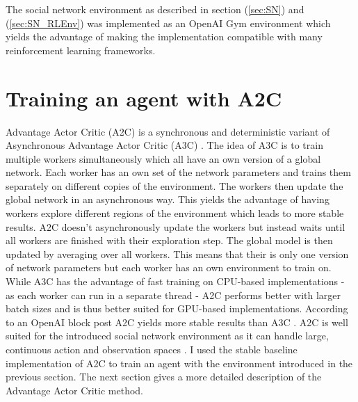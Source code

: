 \documentclass[11pt, a4paper]{article}
\begin{document}
The social network environment as described in section (\ref{sec:SN}) and (\ref{sec:SN_RLEnv}) was implemented as an OpenAI Gym \cite{gym} environment which yields the advantage of making the implementation compatible with many reinforcement learning frameworks.

\section{Training an agent with A2C}
Advantage Actor Critic (A2C) \cite{A2C_1} is a synchronous and deterministic variant of Asynchronous Advantage Actor Critic (A3C) \cite{A3C_1,A3C_2}. The idea of A3C is to train multiple workers simultaneously which all have an own version of a global network. Each worker has an own set of the network parameters and trains them separately on different copies of the environment. The workers then update the global network in an asynchronous way. This yields the advantage of having workers explore different regions of the environment which leads to more stable results. A2C doesn't asynchronously update the workers but instead waits until all workers are finished with their exploration step. The global model is then updated by averaging over all workers. This means that their is only one version of network parameters but each worker has an own environment to train on. While A3C has the advantage of fast training on CPU-based implementations \cite{A3C_1} - as each worker can run in a separate thread - A2C performs better with larger batch sizes and is thus better suited for GPU-based implementations. According to an OpenAI block post A2C yields more stable results than A3C \cite{A2C_3}. A2C is well suited for the introduced social network environment as it can handle large, continuous action and observation spaces \cite{A2C_1}. I used the stable baseline \cite{stable-baselines} implementation of A2C to train an agent with the environment introduced in the previous section. \newline
The next section gives a more detailed description of the Advantage Actor Critic method.
\end{document}

